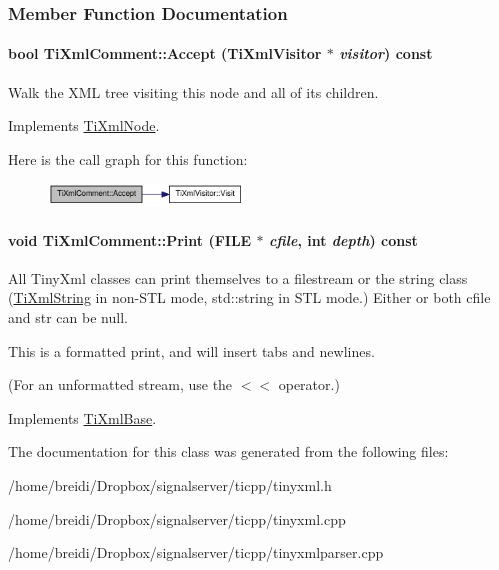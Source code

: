 \subsubsection{Member Function Documentation}
\hypertarget{class_ti_xml_comment_a4382de0e50da973f11a23ea5852568bd}{
\paragraph[{Accept}]{\setlength{\rightskip}{0pt plus 5cm}bool TiXmlComment::Accept ({\bf TiXmlVisitor} $\ast$ {\em visitor}) const}\hfill}
\label{class_ti_xml_comment_a4382de0e50da973f11a23ea5852568bd}
Walk the XML tree visiting this node and all of its children. 

Implements \hyperlink{class_ti_xml_node_acc0f88b7462c6cb73809d410a4f5bb86}{TiXmlNode}.

Here is the call graph for this function:\nopagebreak
\begin{figure}[H]
\begin{center}
\leavevmode
\includegraphics[width=147pt]{class_ti_xml_comment_a4382de0e50da973f11a23ea5852568bd_cgraph}
\end{center}
\end{figure}
\hypertarget{class_ti_xml_comment_a17398061d62c470f57801ce28fa33ad4}{
\paragraph[{Print}]{\setlength{\rightskip}{0pt plus 5cm}void TiXmlComment::Print (FILE $\ast$ {\em cfile}, \/  int {\em depth}) const}\hfill}
\label{class_ti_xml_comment_a17398061d62c470f57801ce28fa33ad4}
All TinyXml classes can print themselves to a filestream or the string class (\hyperlink{class_ti_xml_string}{TiXmlString} in non-\/STL mode, std::string in STL mode.) Either or both cfile and str can be null.

This is a formatted print, and will insert tabs and newlines.

(For an unformatted stream, use the $<$$<$ operator.) 

Implements \hyperlink{class_ti_xml_base_a0de56b3f2ef14c65091a3b916437b512}{TiXmlBase}.

The documentation for this class was generated from the following files:\begin{DoxyCompactItemize}
\item 
/home/breidi/Dropbox/signalserver/ticpp/tinyxml.h\item 
/home/breidi/Dropbox/signalserver/ticpp/tinyxml.cpp\item 
/home/breidi/Dropbox/signalserver/ticpp/tinyxmlparser.cpp\end{DoxyCompactItemize}
